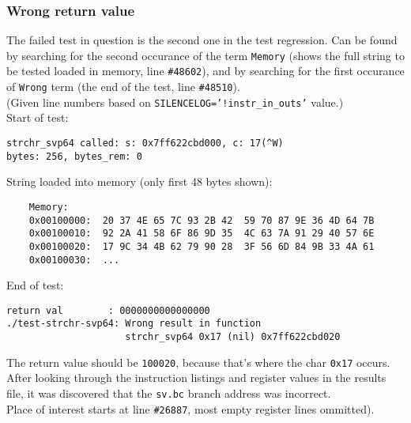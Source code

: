 \subsubsection{Wrong return value}

The failed test in question is the second one in the test regression. Can be
found by searching for the second occurance of the term \texttt{Memory}
(shows the full string to be tested loaded in memory, line \texttt{\#48602}),
and by searching for the first occurance of \texttt{Wrong} term
(the end of the test, line \texttt{\#48510}).\\

(Given line numbers based on \texttt{SILENCELOG='!instr\_in\_outs'} value.)\\

Start of test:

\begin{verbatim}
strchr_svp64 called: s: 0x7ff622cbd000, c: 17(^W)
bytes: 256, bytes_rem: 0
\end{verbatim}

String loaded into memory (only first 48 bytes shown):

\begin{verbatim}
    Memory:
    0x00100000:  20 37 4E 65 7C 93 2B 42  59 70 87 9E 36 4D 64 7B
    0x00100010:  92 2A 41 58 6F 86 9D 35  4C 63 7A 91 29 40 57 6E
    0x00100020:  17 9C 34 4B 62 79 90 28  3F 56 6D 84 9B 33 4A 61
    0x00100030:  ...
\end{verbatim}

End of test:

\begin{verbatim}
return val        : 0000000000000000
./test-strchr-svp64: Wrong result in function
                     strchr_svp64 0x17 (nil) 0x7ff622cbd020
\end{verbatim}

The return value should be \texttt{100020}, because that's where
the char \texttt{0x17} occurs.\\

After looking through the instruction listings and register values in the
results file, it was discovered that the \texttt{sv.bc} branch address
was incorrect.\\

Place of interest starts at line \texttt{\#26887}, most empty register
lines ommitted).

